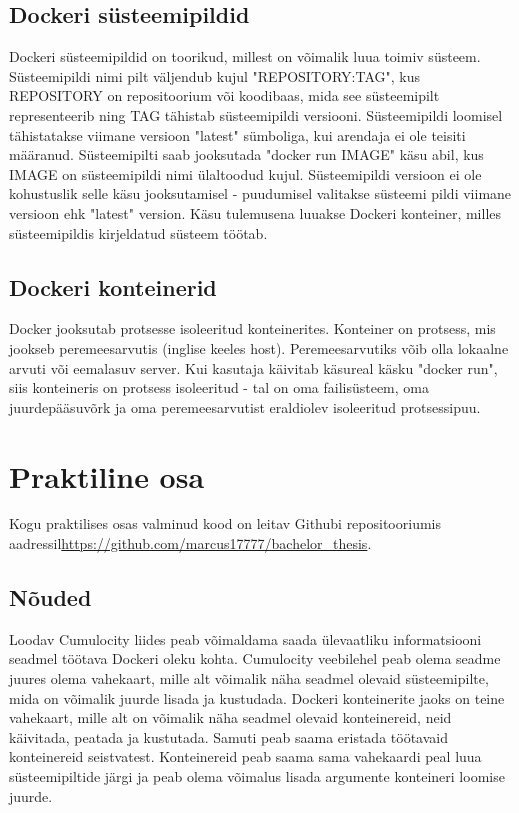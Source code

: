 \documentclass[12pt]{article}
\begin{document}
  \subsection{Dockeri süsteemipildid}
  Dockeri süsteemipildid on toorikud, millest on võimalik luua toimiv süsteem. Süsteemipildi
  nimi pilt väljendub kujul "REPOSITORY:TAG", kus REPOSITORY on repositoorium või koodibaas,
  mida see süsteemipilt representeerib ning TAG tähistab süsteemipildi versiooni.
  Süsteemipildi loomisel tähistatakse viimane versioon "latest" sümboliga, kui arendaja ei ole
  teisiti määranud. Süsteemipilti saab jooksutada "docker run IMAGE" käsu abil, kus IMAGE on
  süsteemipildi nimi ülaltoodud kujul. Süsteemipildi versioon ei ole kohustuslik selle käsu
  jooksutamisel - puudumisel valitakse süsteemi pildi viimane versioon ehk "latest" version.
  Käsu tulemusena luuakse Dockeri konteiner, milles süsteemipildis kirjeldatud süsteem töötab.

  \subsection{Dockeri konteinerid}
  Docker jooksutab protsesse isoleeritud konteinerites. Konteiner on protsess, mis jookseb
  peremeesarvutis (inglise keeles host). Peremeesarvutiks võib olla lokaalne arvuti või
  eemalasuv server. Kui kasutaja käivitab käsureal käsku "docker run", siis konteineris
  on protsess isoleeritud - tal on oma failisüsteem, oma juurdepääsuvõrk ja oma
  peremeesarvutist eraldiolev isoleeritud protsessipuu.
  


 \newpage
 \section{Praktiline osa}
 Kogu praktilises osas valminud kood on leitav Githubi repositooriumis aadressil\newline \url{https://github.com/marcus17777/bachelor\_thesis}.

 \subsection{Nõuded}
 Loodav Cumulocity liides peab võimaldama saada ülevaatliku informatsiooni seadmel töötava
 Dockeri oleku kohta. Cumulocity veebilehel peab olema seadme juures olema vahekaart, mille
 alt võimalik näha seadmel olevaid süsteemipilte, mida on võimalik juurde lisada ja kustudada.
 Dockeri konteinerite jaoks on teine vahekaart, mille alt on võimalik näha seadmel olevaid
 konteinereid, neid käivitada, peatada ja kustutada. Samuti peab saama eristada töötavaid
 konteinereid seistvatest. Konteinereid peab saama sama vahekaardi
 peal luua süsteemipiltide järgi ja peab olema võimalus lisada argumente konteineri
 loomise juurde. 
\end{document}
